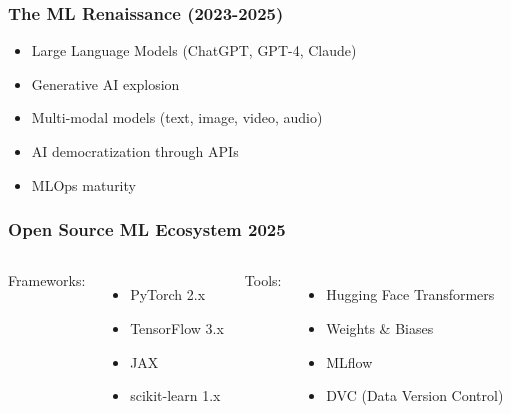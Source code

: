 \begin{frame}[fragile]\frametitle{The ML Renaissance (2023-2025)}
\begin{itemize}
\item Large Language Models (ChatGPT, GPT-4, Claude)
\item Generative AI explosion
\item Multi-modal models (text, image, video, audio)
\item AI democratization through APIs
\item MLOps maturity
\end{itemize}
\end{frame}

\begin{frame}[fragile]\frametitle{Open Source ML Ecosystem 2025}
\begin{columns}
Frameworks:
\begin{itemize}
\item PyTorch 2.x
\item TensorFlow 3.x
\item JAX
\item scikit-learn 1.x
\end{itemize}

Tools:
\begin{itemize}
\item Hugging Face Transformers
\item Weights \& Biases
\item MLflow
\item DVC (Data Version Control)
\end{itemize}
\end{columns}
\end{frame}





